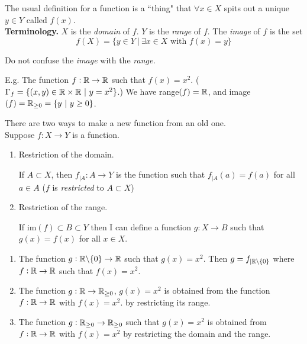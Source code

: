 \documentclass[10pt]{scrartcl}
\begin{document}
The usual definition for a function is a ``thing" that $\forall x \in X$ spits out a unique $y \in Y$ called $f(x)$.\\

\textbf{Terminology.} $X$ is the \emph{domain} of $f$. $Y$ is the \emph{range} of $f$. The \emph{image} of $f$ is the set 
\[f(X) = \{y \in Y ~|~ \exists x \in X \text{ with } f(x) = y\}\]
\vsp
\begin{warning}
Do not confuse the \emph{image} with the \emph{range.}	

E.g. The function $f: \mathbb{R} \to \mathbb{R}$ such that $f(x) = x^2$. ($\Gamma_f = \{(x,y) \in \mathbb{R} \times \mathbb{R} ~|~ y = x^2\}$.) We have range$(f) = \mathbb{R}$, and image$(f) = \mathbb{R}_{\geq 0} = \{y ~|~ y \geq 0\}$.\\
\end{warning}

There are two ways to make a new function from an old one.\\Suppose $f: X \to Y$ is a function. 

\begin{enumerate}
\item Restriction of the domain. 

If $A \subset X$, then $f_{|A} : A \to Y$ is the function such that $f_{|A}(a) = f(a)$ for all $a \in A$ ($f$ is \emph{restricted} to $A \subset X$)

\item Restriction of the range. 

If im$(f) \subset B \subset Y$ then I can define a function $g: X \to B$ such that $g(x) = f(x)$ for all $x \in X$. \\
\end{enumerate}

\begin{examples}
\begin{enumerate}
\item The function $g: \mathbb{R} \backslash\{0\} \to \mathbb{R}$ such that $g(x) = x^2$. Then $g = f_{|\mathbb{R}\backslash\{0\}}$ where $f:\mathbb{R} \to \mathbb{R}$ such that  $f(x) = x^2$.
\item The function $g: \mathbb{R} \to \mathbb{R}_{\geq 0}$, $g(x) = x^2$ is obtained from the function $f:\mathbb{R} \to \mathbb{R}$ with  $f(x) = x^2$. by restricting its range. 
\item The function $g: \mathbb{R}_{\geq 0} \to \mathbb{R}_{\geq 0}$ such that $g(x) = x^2$ is obtained from $f:\mathbb{R} \to \mathbb{R}$ with $f(x) = x^2$ by restricting the domain and the range. 
\end{enumerate}	
\end{examples}\vspace*{5pt}
\end{document}
